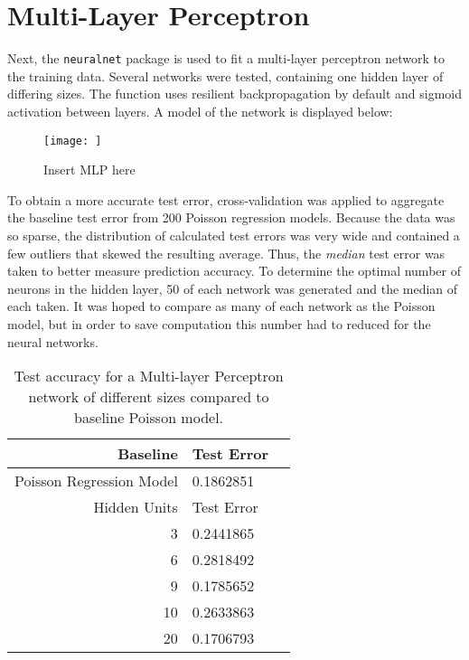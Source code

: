 
\section{Multi-Layer Perceptron}

Next, the \texttt{neuralnet} package \cite{neuralnet} is used to fit a multi-layer perceptron network to the training data.  Several networks were tested, containing one hidden layer of differing sizes.  The function uses resilient backpropagation by default and sigmoid activation between layers.  A model of the network is displayed below:

\begin{figure}[H]
    \center
    \texttt{[image: ]}
    \caption{\footnotesize{Insert MLP here}}
    \label{tohoku_unfit}
\end{figure}

To obtain a more accurate test error, cross-validation was applied to aggregate the baseline test error from 200 Poisson regression models. Because the data was so sparse, the distribution of calculated test errors was very wide and contained a few outliers that skewed the resulting average.  Thus, the \textit{median} test error was taken to better measure prediction accuracy.  To determine the optimal number of neurons in the hidden layer, 50 of each network was generated and the median of each taken.  It was hoped to compare as many of each network as the Poisson model, but in order to save computation this number had to reduced for the neural networks.

\begin{table}[ht]
\centering
\begin{tabular}{rlr}
  \hline
 Baseline & Test Error \\ 
  \hline
  Poisson Regression Model & 0.1862851 \\ 
  \hline
 Hidden Units & Test Error \\ 
  \hline
3 & 0.2441865 \\ 
  6 & 0.2818492 \\ 
  9 & 0.1785652 \\ 
  10 & 0.2633863 \\ 
  20 & 0.1706793 \\ 
   \hline
\end{tabular}
   \caption{\footnotesize Test accuracy for a Multi-layer Perceptron network of different sizes compared to baseline Poisson model.}
\end{table}


